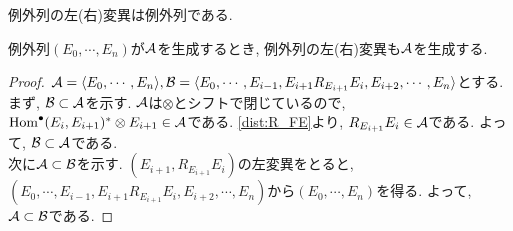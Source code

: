 \documentclass[uplatex, a4paper, 14Q, dvipdfmx]{jsarticle}
\begin{document}
\begin{theorem} \label{prop:mutation_is_also_exceptional}
  例外列の左(右)変異は例外列である. 
\end{theorem}

\begin{lemma}
  例外列$(E_0,\cdots,E_n)$が$\mathcal{A}$を生成するとき, 例外列の左(右)変異も$\mathcal{A}$を生成する. 
\end{lemma}

\begin{proof}
  $\mathcal{A} = \langle E_0,\cdots,E_n \rangle, \mathcal{B} = \langle E_0,\cdots,E_{i-1}, E_{i+1}R_{E_{i+1}}E_i, E_{i+2},\cdots,E_n \rangle$とする.
  まず, $\mathcal{B} \subset \mathcal{A}$を示す. 
  $\mathcal{A}$は$\otimes$とシフトで閉じているので, $\mathrm{Hom}^\bullet(E_i,E_{i+1})^\ast \otimes E_{i+1} \in \mathcal{A}$である. 
  \cref{dist:R_FE}より, $R_{E_{i+1}}E_i \in \mathcal{A}$である. 
  よって, $\mathcal{B} \subset \mathcal{A}$である. \\
  次に$\mathcal{A} \subset \mathcal{B}$を示す.
  $(E_{i+1},R_{E_{i+1}}E_i)$の左変異をとると, $(E_0,\cdots,E_{i-1}, E_{i+1}R_{E_{i+1}}E_i, E_{i+2},\cdots,E_n)$から$(E_0,\cdots,E_n)$を得る. 
  よって, $\mathcal{A} \subset \mathcal{B}$である.
\end{proof}




\end{document}
